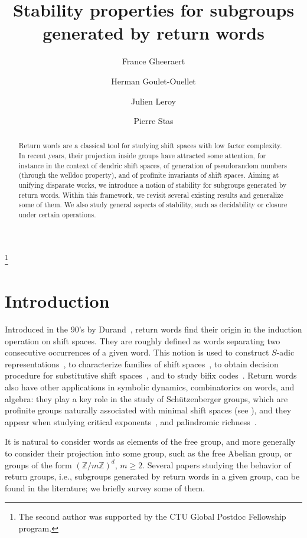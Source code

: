 \documentclass{amsart}
\newcommand*{\zz}{\mathbb{Z}}
\theoremstyle{plain}
\theoremstyle{definition}
\theoremstyle{remark}
\begin{document}
\author[F. Gheeraert]{France Gheeraert}
\author[H. Goulet-Ouellet]{Herman Goulet-Ouellet}
\thanks{The second author was supported by the CTU Global Postdoc Fellowship program.}
\author[J. Leroy]{Julien Leroy}
\author[P. Stas]{Pierre Stas}

\title{Stability properties for subgroups generated by return words}

\begin{abstract}
Return words are a classical tool for studying shift spaces with low factor complexity. In recent years, their projection inside groups have attracted some attention, for instance in the context of dendric shift spaces, of generation of pseudorandom numbers (through the welldoc property), and of profinite invariants of shift spaces. Aiming at unifying disparate works, we introduce a notion of stability for subgroups generated by return words. Within this framework, we revisit several existing results and generalize some of them. We also study general aspects of stability, such as decidability or closure under certain operations. 
\end{abstract}

\maketitle

\section{Introduction}

Introduced in the 90's by Durand~\cite{Durand1998}, return words find their origin in the induction operation on shift spaces. They are roughly defined as words separating two consecutive occurrences of a given word. This notion is used to construct $S$-adic representations~\cite{Durand1998}, to characterize families of shift spaces~\cite{Vuillon2001,Balkova2008,pre/Gheeraert2024}, to obtain decision procedure for substitutive shift spaces~\cite{Durand_minimality,Durand_Leroy_2022}, and to study bifix codes~\cite{maximal_bifix_decoding}. Return words also have other applications in symbolic dynamics, combinatorics on words, and algebra: they play a key role in the study of Schützenberger groups, which are profinite groups naturally associated with minimal shift spaces (see \cite{book/Almeida2020}), and they appear when studying critical exponents~\cite{Dolce2023,Dvorakova2024}, and palindromic richness~\cite{Glen2009b}. 

It is natural to consider words as elements of the free group, and more generally to consider their projection into some group, such as the free Abelian group, or groups of the form $(\zz/m\zz)^d$, $m\geq 2$. Several papers studying the behavior of return groups, i.e., subgroups generated by return words in a given group, can be found in the literature; we briefly survey some of them.
\end{document}

